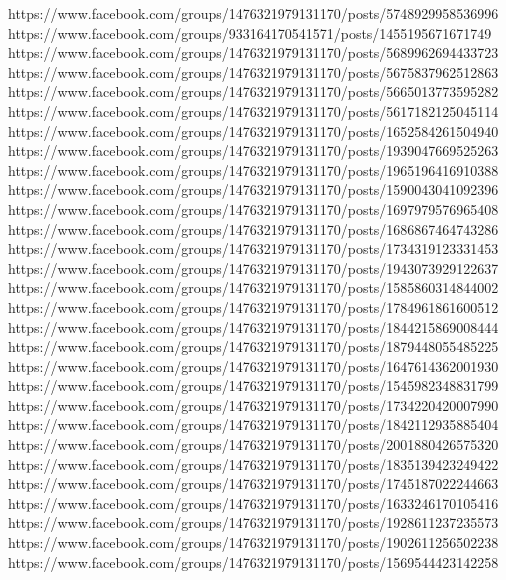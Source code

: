  
 
 
 
 


https://www.facebook.com/groups/1476321979131170/posts/5748929958536996
https://www.facebook.com/groups/933164170541571/posts/1455195671671749
https://www.facebook.com/groups/1476321979131170/posts/5689962694433723
https://www.facebook.com/groups/1476321979131170/posts/5675837962512863
https://www.facebook.com/groups/1476321979131170/posts/5665013773595282
https://www.facebook.com/groups/1476321979131170/posts/5617182125045114
https://www.facebook.com/groups/1476321979131170/posts/1652584261504940
https://www.facebook.com/groups/1476321979131170/posts/1939047669525263
https://www.facebook.com/groups/1476321979131170/posts/1965196416910388
https://www.facebook.com/groups/1476321979131170/posts/1590043041092396
https://www.facebook.com/groups/1476321979131170/posts/1697979576965408
https://www.facebook.com/groups/1476321979131170/posts/1686867464743286
https://www.facebook.com/groups/1476321979131170/posts/1734319123331453
https://www.facebook.com/groups/1476321979131170/posts/1943073929122637
https://www.facebook.com/groups/1476321979131170/posts/1585860314844002
https://www.facebook.com/groups/1476321979131170/posts/1784961861600512
https://www.facebook.com/groups/1476321979131170/posts/1844215869008444
https://www.facebook.com/groups/1476321979131170/posts/1879448055485225
https://www.facebook.com/groups/1476321979131170/posts/1647614362001930
https://www.facebook.com/groups/1476321979131170/posts/1545982348831799
https://www.facebook.com/groups/1476321979131170/posts/1734220420007990
https://www.facebook.com/groups/1476321979131170/posts/1842112935885404
https://www.facebook.com/groups/1476321979131170/posts/2001880426575320
https://www.facebook.com/groups/1476321979131170/posts/1835139423249422
https://www.facebook.com/groups/1476321979131170/posts/1745187022244663
https://www.facebook.com/groups/1476321979131170/posts/1633246170105416
https://www.facebook.com/groups/1476321979131170/posts/1928611237235573
https://www.facebook.com/groups/1476321979131170/posts/1902611256502238
https://www.facebook.com/groups/1476321979131170/posts/1569544423142258
